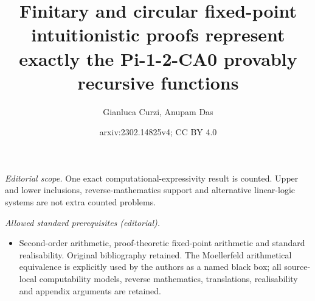 \documentclass[10pt,a4paper]{amsart}
\title{Finitary and circular fixed-point intuitionistic proofs represent exactly the Pi-1-2-CA0 provably recursive functions}
\author{Gianluca Curzi, Anupam Das}
\date{arxiv:2302.14825v4; CC BY 4.0}
\theoremstyle{plain}
\theoremstyle{definition}
\newcommand{\blue}[1]{{\color{blue}#1}}
\newcommand{\comment}[1]{\blue{#1}}
\newcommand{\anupam}[1]{\todo[color=green]{A: #1}}
\renewcommand{\todo}[1]{}
\renewcommand{\comment}[1]{}
\renewcommand{\anupam}[1]{}
\theoremstyle{plain}
\theoremstyle{definition} %
\newcommand{\Var}{\mathrm{Var}}
\newcommand{\var}{\mathrm{var}}
\newcommand{\Types}{\mathrm{Typ}}
\newcommand{\closure}[1]{\langle #1 \rangle}
\newcommand{\arrow}{\to}
\newcommand{\seqar}{\Rightarrow}
\newcommand{\mulunf}{\lr \mu'}
\newcommand{\iter}[1]{\mathsf{iter}_{#1}}
\newcommand{\lr}[1]{#1_l}
\newcommand{\LJ}{\mathsf{LJ}}
\newcommand{\muLJ}{\mu\LJ}
\newcommand{\muLJnorec}{\mu'\LJ}
\newcommand{\circular}{\mathsf C}
\newcommand{\cmuLJ}{\circular\muLJ}
\begin{document}
\maketitle
\noindent\textit{Editorial scope.} One exact computational-expressivity result is counted. Upper and lower inclusions, reverse-mathematics support and alternative linear-logic systems are not extra counted problems.\par\medskip
\noindent\textit{Allowed standard prerequisites (editorial).}\begin{itemize}
\item Second-order arithmetic, proof-theoretic fixed-point arithmetic and standard realisability. Original bibliography retained. The Moellerfeld arithmetical equivalence is explicitly used by the authors as a named black box; all source-local computability models, reverse mathematics, translations, realisability and appendix arguments are retained.
\end{itemize}\medskip

\comment{Conventions/notations:
\begin{itemize}
\item not using todo-notes, instead using bespoke macros to easily distinguish different types of todos, and so they are not visually overbearing.
    \item Now using a macro for arrow-type (currently $\arrow$). \anupam{I sometimes forget and use $\to$, not a big deal anymore.} No dot after binders in grammars (it is a meta-level notation). $\lambda$ etc.\ binds as strongly as possible (unless there is a dot).
    \item application always without brackets, i.e.\ $st$ not $s(t)$. This is consistent with above convention.
    \item $\closure A$ is the closure of a set $A$ of (co)terms under untyped application. Just saying `typed' for typed version at the moment.
    \item Notation convention: everything to do with $\muLJ$ and the iteration rules have standard notations (e.g.\ $\muLJ$, $\lr \mu$, $\iter{}$); everything to do with $\cmuLJ$ and left-unfolding rules currently have `primed' notations (e.g.\ $\muLJnorec$, $\mulunf$, $\iter{}'$). \anupam{I am not necessarily sold on this notation, I welcome alternative suggestions. If we keep might be better to call $\cmuLJ$ something like $\muLJnorec_{\mathrm{reg}}$}
    \item do not say `number-theoretic function', better to say `function on natural numbers' or even `numerical function'.
    \item use $\Sigma, \Gamma$ for lists/cedents of types to avoid too many arrows.
    \item use $\seqar$ for sequent arrow, not $\vdash$ since that is reserved for provability (mathematical judgement, not syntactic delimiter).
    \item Using mathrm for meta-level sets (e.g. $\var, \Var, \Types$).
    \item using mathsf for term constants, proof rules etc.
    \item Do not use cref: does not work with this document class
\end{itemize}
}
\end{document}
